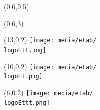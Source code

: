 \documentclass[a4paper]{article}
\newcommand{\NNT}{2019SACLS2793} 															%
\newcommand{\logoEt}{CEALIST} 																%
\newcommand{\vpos}{0.2}																	%
\newcommand{\hpos}{10}																		%
\newcommand{\logoEtt}{UPSUD}  																%
\newcommand{\vpostt}{0.2} 																	%
\newcommand{\hpostt}{13}																	%
\newcommand{\logoEttt}{UNICE}  																%
\newcommand{\vposttt}{0.2} 																	%
\newcommand{\hposttt}{6}																	%
\begin{document}
\begin{textblock}{1}(0.6,9.5)
	
	\Huge{}
\end{textblock}

\begin{textblock}{1}(0.6,3)
	\Large{\rotatebox{90}{\color{white}{NNT : \NNT}}}
\end{textblock}


                            

\begin{textblock}{1}(\hpostt,\vpostt)
	\texttt{[image: media/etab/\\logoEtt.png]}
\end{textblock}

\begin{textblock}{1}(\hpos,\vpos)
		\texttt{[image: media/etab/\\logoEt.png]}	
\end{textblock}

\begin{textblock}{1}(\hposttt,\vposttt)
		\texttt{[image: media/etab/\\logoEttt.png]}	
\end{textblock}
\end{document}
